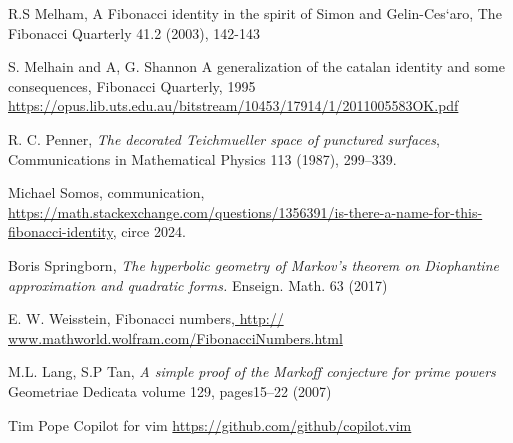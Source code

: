 \documentclass[12pt,a4paper]{amsart}
\begin{document}
 R.S Melham, A Fibonacci identity in the spirit of Simon and Gelin-Ces`aro, The Fibonacci Quarterly 41.2
(2003), 142-143

 S. Melhain and A, G. Shannon
A generalization of the catalan identity and some consequences,
Fibonacci Quarterly, 1995
\url{https://opus.lib.uts.edu.au/bitstream/10453/17914/1/2011005583OK.pdf}

R. C. Penner, 
\textit{The decorated Teichmueller space of punctured surfaces}, 
Communications in Mathematical Physics 113 (1987), 299–339.

Michael Somos, communication,
\url{https://math.stackexchange.com/questions/1356391/is-there-a-name-for-this-fibonacci-identity},
circe 2024.

Boris Springborn, 
\textit{The hyperbolic geometry of Markov’s theorem on Diophantine
approximation and quadratic forms.} Enseign. Math. 63 (2017)

 E. W. Weisstein, Fibonacci numbers,\url{ http://
 www.mathworld.wolfram.com/FibonacciNumbers.html}




M.L. Lang, S.P Tan,
\textit{A simple proof of the Markoff conjecture for prime powers}
Geometriae Dedicata volume 129, pages15–22 (2007)



  Tim Pope Copilot for vim
   \url{https://github.com/github/copilot.vim}

%


%
%
%
%


 
\end{document}
